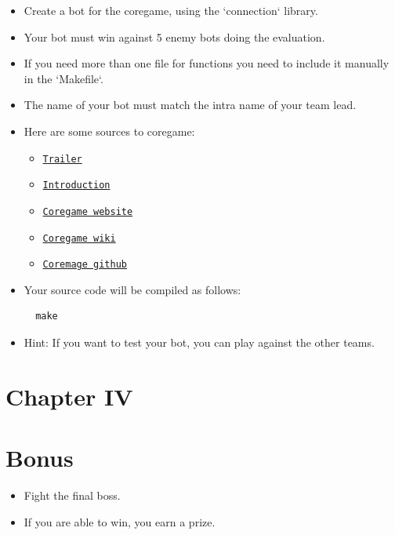\documentclass[12pt]{article}
\begin{document}
\begin{itemize}
  \item Create a bot for the coregame, using the `connection` library.
  
  \item Your bot must win against 5 enemy bots doing the evaluation.
  
  \item If you need more than one file for functions you need to include it manually in the `Makefile`.
  
  \item The name of your bot must match the intra name of your team lead.
  
  \item Here are some sources to coregame:
  \begin{itemize}
    \item \href{https://youtu.be/gMmBgHnb8Nc?si=Thm0HOCfNIZbfCnI}{\texttt{Trailer}}
    \item \href{https://shattereddisk.github.io/rickroll/rickroll.mp4}{\texttt{Introduction}}
    \item \href{https://coregame.de}{\texttt{Coregame website}}
    \item \href{https://wiki.coregame.de}{\texttt{Coregame wiki}}
    \item \href{https://github.com/42core-team}{\texttt{Coremage github}}
  \end{itemize}
  
  \item Your source code will be compiled as follows:
  
  \begin{verbatim}
  make
  \end{verbatim}
  
  \item Hint: If you want to test your bot, you can play against the other teams.
\end{itemize}

\newpage

\section*{\LARGE Chapter IV}
\section*{\LARGE Bonus}

\begin{itemize}
  \item Fight the final boss.
  \item If you are able to win, you earn a prize. 
\end{itemize}
\end{document}
